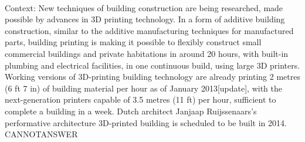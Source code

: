 \documentclass[11pt,a4paper, onecolumn]{article}
\begin{document}
\\ Context: New techniques of building construction are being researched, made possible by advances in 3D printing technology. In a form of additive building construction, similar to the additive manufacturing techniques for manufactured parts, building printing is making it possible to flexibly construct small commercial buildings and private habitations in around 20 hours, with built-in plumbing and electrical facilities, in one continuous build, using large 3D printers. Working versions of 3D-printing building technology are already printing 2 metres (6 ft 7 in) of building material per hour as of January 2013[update], with the next-generation printers capable of 3.5 metres (11 ft) per hour, sufficient to complete a building in a week. Dutch architect Janjaap Ruijssenaars's performative architecture 3D-printed building is scheduled to be built in 2014. CANNOTANSWER
\end{document}
